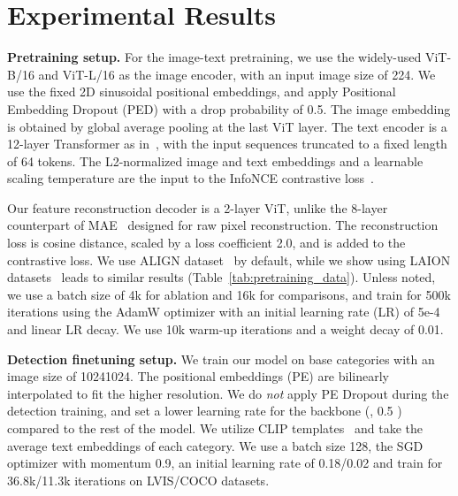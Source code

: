 \documentclass[10pt,twocolumn,letterpaper]{article}
\newcommand{\tabref}[1]{Table~\ref{#1}}
\renewcommand{\paragraph}[1]{\vspace{1mm}\noindent\textbf{#1}}
\begin{document}
\section{Experimental Results}
\label{sec:results}

\paragraph{Pretraining setup.}\quad
For the image-text pretraining, we use the widely-used ViT-B/16 and ViT-L/16 as the image encoder, with an input image size of 224. We use the fixed 2D sinusoidal positional embeddings, and apply Positional Embedding Dropout (PED) with a drop probability of 0.5. The image embedding is obtained by global average pooling at the last ViT layer. The text encoder is a 12-layer Transformer as in~\cite{radford2021clip, yu2022coca}, with the input sequences truncated to a fixed length of 64 tokens. The L2-normalized image and text embeddings and a learnable scaling temperature are the input to the InfoNCE contrastive loss~\cite{radford2021clip}.

Our feature reconstruction decoder is a 2-layer ViT, unlike the 8-layer counterpart of MAE~\cite{he2022masked} designed for raw pixel reconstruction. The reconstruction loss is cosine distance, scaled by a loss coefficient 2.0, and is added to the contrastive loss. We use ALIGN dataset~\cite{align} by default, while we show using LAION datasets~\cite{schuhmann2021laion} leads to similar results (\tabref{tab:pretraining_data}). Unless noted, we use a batch size of 4k for ablation and 16k for comparisons, and train for 500k iterations using the AdamW optimizer with an initial learning rate (LR) of 5e-4 and linear LR decay. We use 10k warm-up iterations and a weight decay of 0.01.

\paragraph{Detection finetuning setup.}\quad
We train our model on base categories  with an image size of 10241024. The positional embeddings (PE) are bilinearly interpolated to fit the higher resolution. We do \textit{not} apply PE Dropout during the detection training, and set a lower learning rate for the backbone (\eg, 0.5 ) compared to the rest of the model. We utilize CLIP templates~\cite{radford2021clip} and take the average text embeddings of each category. We use a batch size 128, the SGD optimizer with momentum 0.9, an initial learning rate of 0.18/0.02 and train for 36.8k/11.3k iterations on LVIS/COCO datasets.
\end{document}
